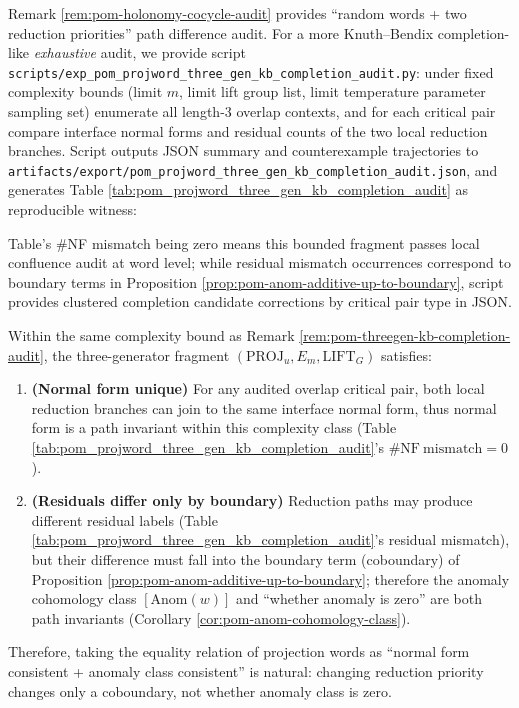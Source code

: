 \begin{remark}\label{rem:pom-threegen-kb-completion-audit}
Remark \ref{rem:pom-holonomy-cocycle-audit} provides ``random words + two reduction priorities'' path difference audit.
For a more Knuth--Bendix completion-like \emph{exhaustive} audit, we provide script
\texttt{scripts/exp\_pom\_projword\_three\_gen\_kb\_completion\_audit.py}:
under fixed complexity bounds (limit \(m\), limit lift group list, limit temperature parameter sampling set) enumerate all length-\(3\) overlap contexts,
and for each critical pair compare interface normal forms and residual counts of the two local reduction branches.
Script outputs JSON summary and counterexample trajectories to
\texttt{artifacts/export/pom\_projword\_three\_gen\_kb\_completion\_audit.json},
and generates Table \ref{tab:pom_projword_three_gen_kb_completion_audit} as reproducible witness:

\noindent Table's \(\#\)NF mismatch being zero means this bounded fragment passes local confluence audit at word level;
while residual mismatch occurrences correspond to boundary terms in Proposition \ref{prop:pom-anom-additive-up-to-boundary},
script provides clustered completion candidate corrections by critical pair type in JSON.
\end{remark}

\begin{proposition}\label{prop:pom-confluence-mod-anom-audited}
Within the same complexity bound as Remark \ref{rem:pom-threegen-kb-completion-audit}, the three-generator fragment \((\mathrm{PROJ}_u,E_m,\mathrm{LIFT}_G)\) satisfies:
\begin{enumerate}
  \item \textbf{(Normal form unique)} For any audited overlap critical pair, both local reduction branches can join to the same interface normal form, thus normal form is a path invariant within this complexity class (Table \ref{tab:pom_projword_three_gen_kb_completion_audit}'s \(\#\mathrm{NF\ mismatch}=0\)).
  \item \textbf{(Residuals differ only by boundary)} Reduction paths may produce different residual labels (Table \ref{tab:pom_projword_three_gen_kb_completion_audit}'s residual mismatch), but their difference must fall into the boundary term (coboundary) of Proposition \ref{prop:pom-anom-additive-up-to-boundary}; therefore the anomaly cohomology class \([\mathrm{Anom}(w)]\) and ``whether anomaly is zero'' are both path invariants (Corollary \ref{cor:pom-anom-cohomology-class}).
\end{enumerate}
Therefore, taking the equality relation of projection words as ``normal form consistent + anomaly class consistent'' is natural: changing reduction priority changes only a coboundary, not whether anomaly class is zero.
\end{proposition}


